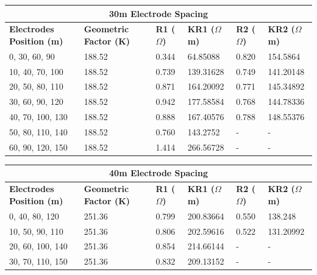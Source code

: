 \documentclass[12pt,a4paper]{report}
\begin{document}
\begin{itemize}
\begin{table}[H]
    \centering
    \begin{adjustbox}{max width=\textwidth}
    \setlength{\tabcolsep}{15pt}
    \renewcommand{\arraystretch}{1.5}
    \begin{tabular}{|p{3.0cm}|p{2.5cm}|p{1.8cm}|p{2.5cm}|p{2cm}|p{3.0cm}|}
    \hline
    \multicolumn{6}{|c|}{\rule{0pt}{2em}\huge\textbf{30m Electrode Spacing}} \\
    \hline
    \textbf{Electrodes Position (m)} & \textbf{Geometric Factor (K)} & \textbf{R1 ($\Omega$)} & \textbf{KR1 ($\Omega$m)} & \textbf{R2 ($\Omega$)} & \textbf{KR2 ($\Omega$m)}  \\ \hline
    0, 30, 60, 90   & 188.52 & 0.344 & 64.85088  & 0.820 & 154.5864  \\ \hline
    10, 40, 70, 100 & 188.52 & 0.739 & 139.31628 & 0.749 & 141.20148 \\ \hline
    20, 50, 80, 110 & 188.52 & 0.871 & 164.20092 & 0.771 & 145.34892 \\ \hline
    30, 60, 90, 120 & 188.52 & 0.942 & 177.58584 & 0.768 & 144.78336 \\ \hline
    40, 70, 100, 130 & 188.52 & 0.888 & 167.40576 & 0.788 & 148.55376 \\ \hline
    50, 80, 110, 140 & 188.52 & 0.760 & 143.2752  & -     & -         \\ \hline
    60, 90, 120, 150 & 188.52 & 1.414 & 266.56728 & -     & -         \\ \hline
    \end{tabular}
\end{adjustbox}
\end{table}

\begin{table}[H]
    \centering
    \begin{adjustbox}{max width=\textwidth}
    \setlength{\tabcolsep}{15pt}
    \renewcommand{\arraystretch}{1.5}
    \begin{tabular}{|p{3.0cm}|p{2.5cm}|p{1.8cm}|p{2.5cm}|p{2cm}|p{3.0cm}|}
    \hline
    \multicolumn{6}{|c|}{\rule{0pt}{2em}\huge\textbf{40m Electrode Spacing}} \\
    \hline
    \textbf{Electrodes Position (m)} & \textbf{Geometric Factor (K)} & \textbf{R1 ($\Omega$)} & \textbf{KR1 ($\Omega$m)} & \textbf{R2 ($\Omega$)} & \textbf{KR2 ($\Omega$m)}  \\ \hline
    0, 40, 80, 120   & 251.36 & 0.799 & 200.83664 & 0.550 & 138.248   \\ \hline
    10, 50, 90, 110  & 251.36 & 0.806 & 202.59616 & 0.522 & 131.20992 \\ \hline
    20, 60, 100, 140 & 251.36 & 0.854 & 214.66144 & -     & -         \\ \hline
    30, 70, 110, 150 & 251.36 & 0.832 & 209.13152 & -     & -         \\ \hline
    \end{tabular}
\end{adjustbox}
\end{table}


\end{itemize}
\end{document}
